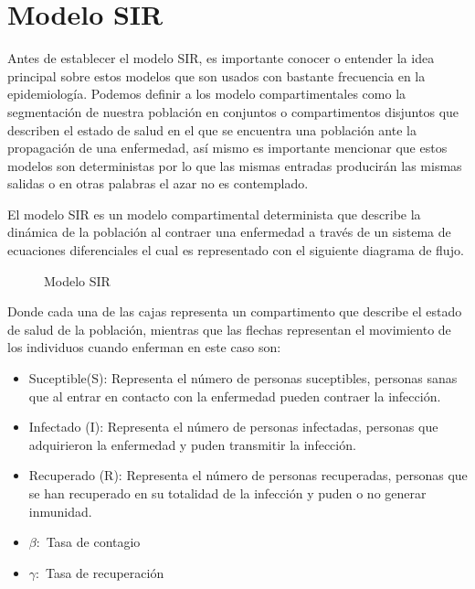 \chapter{\textbf{Modelo SIR}}

Antes de establecer el modelo SIR, es importante conocer o entender la idea principal sobre estos modelos que son usados con bastante frecuencia en la epidemiología. Podemos definir a los modelo compartimentales como la segmentación de nuestra población en conjuntos o compartimentos disjuntos que describen el estado de salud en el que se encuentra una población ante la propagación de una enfermedad, así mismo es importante mencionar que estos modelos son deterministas por lo que las mismas entradas producirán las mismas salidas o en otras palabras el azar no es contemplado.

El modelo SIR es un modelo compartimental determinista que describe la dinámica de la población al contraer una enfermedad a través de un sistema de ecuaciones diferenciales el cual es representado con el siguiente diagrama de flujo.

\begin{figure}[h]
\centering
{}
\caption{Modelo SIR} \label{fig:1.1}
\end{figure}	

Donde cada una de las cajas representa un compartimento que describe el estado de salud de la población, mientras que las flechas representan el movimiento de los individuos cuando enferman en este caso son:

\begin{itemize}
\item Suceptible(S): Representa el número de personas suceptibles, personas sanas que al entrar en contacto con la enfermedad pueden contraer la infección.

\item Infectado (I): Representa el número de personas infectadas, personas que adquirieron la enfermedad y puden transmitir la infección.

\item Recuperado (R): Representa el número de personas recuperadas, personas que se han recuperado en su totalidad de la infección y puden o no generar inmunidad.

\item \textbf{$\beta:$} Tasa de contagio

\item \textbf{$\gamma:$} Tasa de recuperación

\end{itemize}

